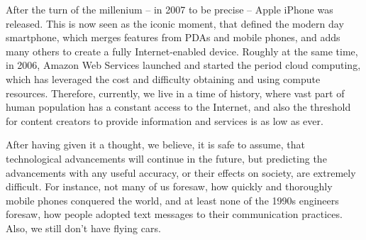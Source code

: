 \documentclass[a4paper,12pt]{article}
\begin{document}
After the turn of the millenium -- in 2007 to be precise -- Apple iPhone was released. This is now seen as the iconic moment, that defined the modern day smartphone, which merges features from PDAs and mobile phones, and adds many others to create a fully Internet-enabled device. Roughly at the same time, in 2006, Amazon Web Services launched and started the period cloud computing, which has leveraged the cost and difficulty obtaining and using compute resources. Therefore, currently, we live in a time of history, where vast part of human population has a constant access to the Internet, and also the threshold for content creators to provide information and services is as low as ever.

After having given it a thought, we believe, it is safe to assume, that technological advancements will continue in the future, but predicting the advancements with any useful accuracy, or their effects on society, are extremely difficult. For instance, not many of us foresaw, how quickly and thoroughly mobile phones conquered the world, and at least none of the 1990s engineers foresaw, how people adopted text messages to their communication practices. Also, we still don't have flying cars.

\newpage
\end{document}
